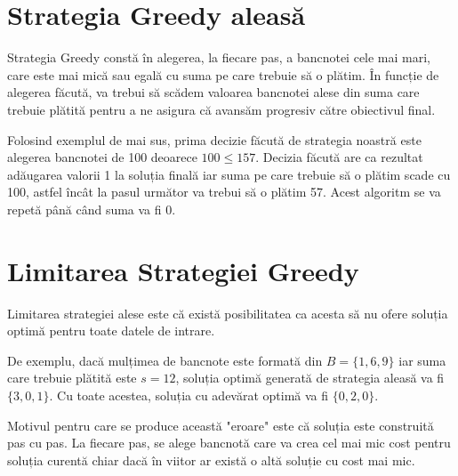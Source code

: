 \section{Strategia Greedy aleasă}

Strategia Greedy constă în alegerea, la fiecare pas, a bancnotei cele mai mari, care este mai mică sau egală cu suma pe care trebuie să o plătim. În funcție de alegerea făcută, va trebui să scădem valoarea bancnotei alese din suma care trebuie plătită pentru a ne asigura că avansăm progresiv către obiectivul final.
\par
Folosind exemplul de mai sus, prima decizie făcută de strategia noastră este alegerea bancnotei de 100 deoarece $ 100 	\leq 157$.  Decizia făcută are ca rezultat adăugarea valorii 1 la soluția finală iar suma pe care trebuie să o plătim scade cu 100, astfel încât la pasul următor va trebui să o plătim 57. Acest algoritm se va repetă până când suma va fi 0.


\section{Limitarea Strategiei Greedy}
Limitarea strategiei alese este că există posibilitatea ca acesta să nu ofere soluția optimă pentru toate datele de intrare.\par
De exemplu, dacă mulțimea de bancnote este formată din $B = \{ 1,6,9 \}$ iar suma care trebuie plătită este $s = 12$, soluția optimă generată de strategia aleasă va fi $\{3,0,1\}$. Cu toate acestea, soluția cu adevărat optimă va fi $\{0,2,0\}$. 

Motivul pentru care se produce această "eroare" este că soluția este construită pas cu pas. La fiecare pas, se alege bancnotă care va crea cel mai mic cost pentru soluția curentă chiar dacă în viitor ar există o altă soluție cu cost mai mic.
